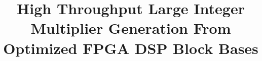 \title{High Throughput Large Integer Multiplier Generation From Optimized FPGA DSP Block Bases}







\renewcommand{\shortauthors}{Elshenawy et al.}



